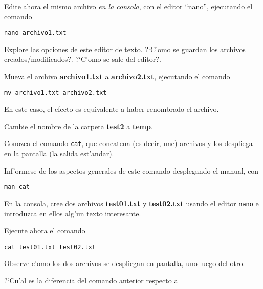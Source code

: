 \documentclass[11pt]{exam}
\begin{document}
\begin{questions}
\begin{parts}
\item Edite ahora el mismo archivo \textit{en la consola}, con el editor ``nano'', ejecutando el comando 

\begin{verbatim}
nano archivo1.txt
\end{verbatim}

 Explore las opciones de este editor de texto. ?`C'omo se guardan los archivos creados/modi\-fi\-ca\-dos?. ?`C'omo se sale del editor?.

\item Mueva el archivo \textbf{archivo1.txt} a \textbf{archivo2.txt}, ejecutando el comando

\begin{verbatim}
mv archivo1.txt archivo2.txt
\end{verbatim}

En este caso, el efecto es equivalente a haber renombrado el archivo.

\item Cambie el nombre de la carpeta \textbf{test2} a \textbf{temp}.

\end{parts}

\item Conozca el comando \texttt{cat}, que concatena (es decir, une) archivos y los despliega en la pantalla (la salida est'andar).
\begin{parts}
\item  Inf'ormese de los aspectos generales de este comando desplegando el manual, con 

\begin{verbatim}
man cat
\end{verbatim}



\item En la consola, cree dos archivos \textbf{test01.txt} y \textbf{test02.txt} usando el editor \texttt{nano} e introduzca en ellos alg'un texto interesante.

\item Ejecute ahora el comando 

\begin{verbatim}
cat test01.txt test02.txt
\end{verbatim}

Observe c'omo los dos archivos se despliegan en pantalla, uno luego del otro.

\item ?`Cu'al es la diferencia del comando anterior respecto a 


\end{parts}
\end{questions}
\end{document}
